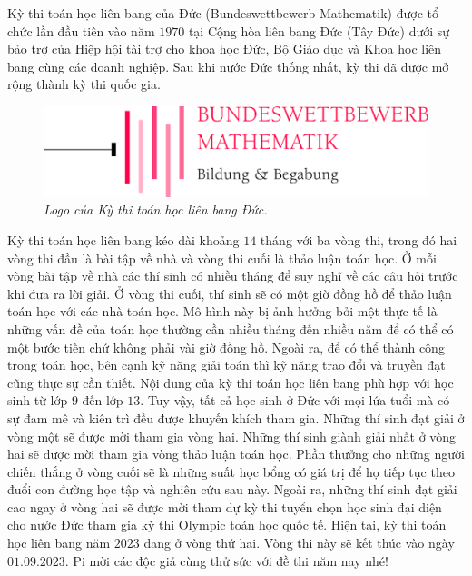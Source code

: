 \begin{multicols}{2}
	Kỳ thi toán học liên bang của Đức (Bundeswettbewerb Mathematik) được tổ chức lần đầu tiên vào năm $1970$ tại Cộng hòa liên bang Đức (Tây Đức) dưới sự bảo trợ của Hiệp hội tài trợ cho khoa học Đức, Bộ Giáo dục và Khoa học liên bang cùng các doanh nghiệp. Sau khi nước Đức thống nhất, kỳ thi đã được mở rộng thành kỳ thi quốc gia. 
	\begin{figure}[H]
		\vspace*{-5pt}
		\centering
		\captionsetup{labelformat= empty, justification=centering}
		\includegraphics[width= 1\linewidth]{2}
		\caption{\small\textit{\color{cackithi}Logo của Kỳ thi toán học liên bang Đức.}}
		\vspace*{-10pt}
	\end{figure}
	Kỳ thi toán học liên bang kéo dài khoảng $14$ tháng với ba vòng thi, trong đó hai vòng thi đầu là bài tập về nhà và vòng thi cuối là thảo luận toán học. Ở mỗi vòng bài tập về nhà các thí sinh có nhiều tháng để suy nghĩ về các câu hỏi trước khi đưa ra lời giải. Ở vòng thi cuối, thí sinh sẽ có một giờ đồng hồ để thảo luận toán học với các nhà toán học. Mô hình này bị ảnh hưởng bởi một thực tế là những vấn đề của toán học thường cần nhiều tháng đến nhiều năm để có thể có một bước tiến chứ không phải vài giờ đồng hồ. Ngoài ra, để có thể thành công trong toán học, bên cạnh kỹ năng giải toán thì kỹ năng trao đổi và truyền đạt cũng thực sự cần thiết. 
	\vskip 0.1cm
	Nội dung của kỳ thi toán học liên bang phù hợp với học sinh từ lớp $9$ đến lớp $13$. Tuy vậy, tất cả học sinh ở Đức với mọi lứa tuổi mà có sự đam mê và kiên trì đều được khuyến khích tham gia. Những thí sinh đạt giải ở vòng một sẽ được mời tham gia vòng hai. Những thí sinh giành giải nhất ở vòng hai sẽ được mời tham gia vòng thảo luận toán học. Phần thưởng cho những người chiến thắng ở vòng cuối sẽ là những suất học bổng có giá trị để họ tiếp tục theo đuổi con đường học tập và nghiên cứu sau này. Ngoài ra, những thí sinh đạt giải cao ngay ở vòng hai sẽ được mời tham dự kỳ thi tuyển chọn học sinh đại diện cho nước Đức tham gia kỳ thi Olympic toán học quốc tế.
	\vskip 0.1cm
	Hiện tại, kỳ thi toán học liên bang năm $2023$ đang ở vòng thứ hai. Vòng thi này sẽ kết thúc vào ngày $01.09.2023$. Pi mời các độc giả cùng thử sức với đề thi năm nay nhé!

\end{multicols}
